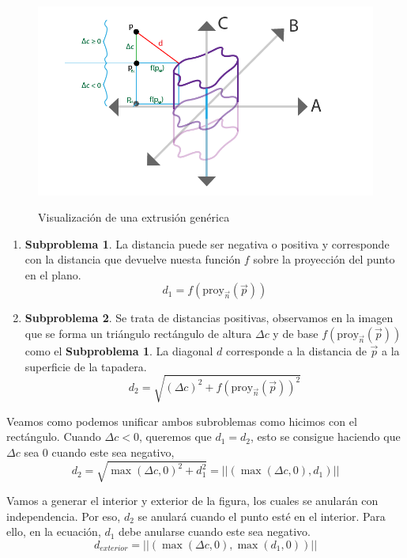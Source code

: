 \begin{figure}[H]
  \centering
  \captionsetup{justification=centering}%
  \includegraphics[width=1.0\textwidth]{secciones/imagenes/sdf/proofs/proof_extrussion.png}\label{fig:capsula}
  \caption{Visualización de una extrusión genérica}
\end{figure}

\begin{enumerate}
    \item \textbf{Subproblema 1}. La distancia puede ser negativa o positiva y corresponde con la distancia que devuelve nuesta función \(f\) sobre la proyección del punto en el plano.
    \[d_1=f(\text{proy}_{\Vec{n}}(\Vec{p}))\]
    \item \textbf{Subproblema 2}. Se trata de distancias positivas, observamos en la imagen que se forma un triángulo rectángulo de altura \(\Delta c\) y de base \(f(\text{proy}_{\Vec{n}}(\Vec{p}))\) como el \textbf{Subproblema 1}. La diagonal \(d\) corresponde a la distancia de \(\Vec{p}\) a la superficie de la tapadera.
    \[d_2=\sqrt{(\Delta c)^2+f(\text{proy}_{\Vec{n}}(\Vec{p}))^2}\]
\end{enumerate}

Veamos como podemos unificar ambos subroblemas como hicimos con el rectángulo. Cuando \(\Delta c < 0\), queremos que \(d_1=d_2\), esto se consigue haciendo que \(\Delta c\) sea 0 cuando este sea negativo,
\[d_2=\sqrt{\max(\Delta c, 0)^2+d_1^2}=\vert\vert (\max(\Delta c, 0), d_1)\vert\vert\]

Vamos a generar el interior y exterior de la figura, los cuales se anularán con independencia. Por eso, \(d_2\) se anulará cuando el punto esté en el interior. Para ello, en la ecuación, \(d_1\) debe anularse cuando este sea negativo.
\[d_{exterior}=\vert\vert (\max(\Delta c,0), \max(d_1, 0))\vert\vert\]


